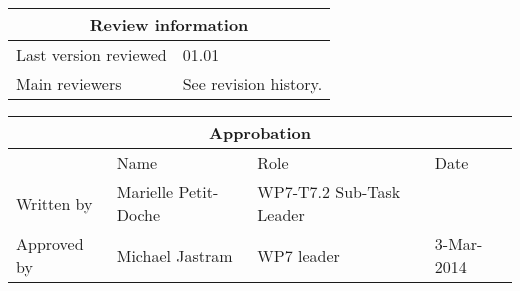 \documentclass{template/openetcs_report}
\begin{document}
\begin{tabular}{|p{4.4cm}|p{8.7cm}|}
\hline
\multicolumn{2}{|c|}{Review information} \\
\hline
Last version reviewed & 01.01 \\
\hline
Main reviewers & See revision history. \\
 
\hline
\end{tabular}

\begin{tabular}{|p{2.2cm}|p{4cm}|p{4cm}|p{2cm}|}
\hline
\multicolumn{4}{|c|}{Approbation} \\
\hline
  &  Name & Role & Date   \\
\hline  
Written by    &  Marielle Petit-Doche & WP7-T7.2 Sub-Task Leader  & \\
\hline
Approved by & Michael Jastram & WP7 leader & 3-Mar-2014 \\
\hline
\end{tabular}



\newcommand{\tbd}{\colorbox{cyan}{\%\%To Be Defined\%\%}}
\newcommand{\tbc}{\colorbox{cyan}{\%\%To Be Confirmed\%\%}}
\newcommand{\todo}[1]{\colorbox{cyan}{\%\%{#1}\%\%}}
\newlength{\origindent}

\newenvironment{issue}{
        \begin{quote}
        \begin{itshape}Open Issue.
}{
        \end{itshape}
        \end{quote}
}

\newenvironment{comment}{
        \begin{quote}
        \begin{itshape}Comment.
}{
        \end{itshape}
        \end{quote}
}

\newenvironment{justif}{
        \begin{quote}
        \begin{itshape}Justification.
}{
        \end{itshape}
        \end{quote}
}


\newenvironment{author_comment}{
        \begin{quote}
        \begin{itshape}\textcolor{green}{Author:}
}{
        \end{itshape}
        \end{quote}
}
\end{document}
